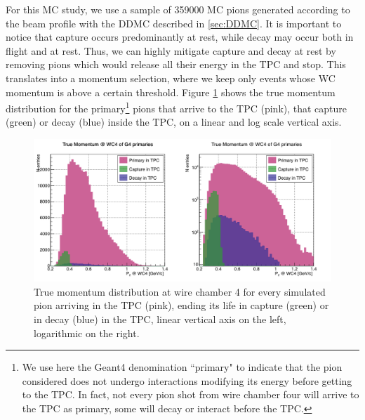 For this MC study, we use a sample of 359000 MC pions generated according to the beam profile with the DDMC described in \ref{sec:DDMC}. It is important to notice that capture occurs predominantly at rest, while decay may occur both in flight and at rest. Thus, we can highly mitigate capture and decay at rest by removing pions which would release all their energy in the TPC and stop. This translates into a momentum selection, where we keep only events whose WC momentum is above a certain threshold. 
Figure \ref{fig:CaptureMom} shows the true momentum distribution for the primary\footnote{We use here the Geant4 denomination ``primary" to indicate that the pion considered does not undergo interactions modifying its energy before getting to the TPC. In fact, not every pion shot from wire chamber four will arrive to the TPC as primary,  some will decay or interact before the TPC.} pions that arrive to the TPC (pink), that capture (green) or decay (blue) inside the TPC, on a linear and log scale vertical axis. 

\begin{figure}[hpbt]
\centering
\includegraphics[width=15cm]{Chapter-7/Images/CDAsMomentumFunct.png}
\caption{True momentum distribution at wire chamber 4 for every simulated pion arriving in the TPC (pink), ending its life in capture (green) or in decay (blue) in the TPC, linear vertical axis on the left, logarithmic on the right. }
\label{fig:CaptureMom}
\end{figure}


